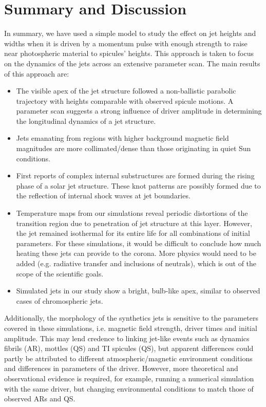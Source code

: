 \section{Summary and Discussion}
\label{sec:c2discussion}
In summary, we have used a simple model to study the effect on jet heights and widths when it is driven by a momentum pulse with enough strength to raise near photospheric material to spicules' heights. This approach is taken to focus on the dynamics of the jets across an extensive parameter scan. The main results of this approach are:  
\begin{itemize}
\item{The visible apex of the jet structure followed a non-ballistic parabolic trajectory with heights comparable with observed spicule motions. A parameter scan suggests a strong influence of driver amplitude in determining the longitudinal dynamics of a jet structure.}

\item{Jets emanating from regions with higher background magnetic field magnitudes are more collimated/dense than those originating in quiet Sun conditions.}

\item{First reports of complex internal substructures are formed during the rising phase of a solar jet structure. These knot patterns are possibly formed due to the reflection of internal shock waves at jet boundaries.}

\item{Temperature maps from our simulations reveal periodic distortions of the transition region due to penetration of jet structure at this layer. However, the jet remained isothermal for its entire life for all combinations of initial parameters. For these simulations, it would be difficult to conclude how much heating these jets can provide to the corona. More physics would need to be added (e.g. radiative transfer and inclusions of neutrals), which is out of the scope of the scientific goals.}

\item{Simulated jets in our study show a bright, bulb-like apex, similar to observed cases of chromospheric jets.}
\end{itemize}
Additionally, the morphology of the synthetics jets is sensitive to the parameters covered in these simulations, i.e. magnetic field strength, driver times and initial amplitude. This may lend credence to linking jet-like events such as dynamics fibrils (AR), mottles (QS) and TI spicules (QS), but apparent differences could partly be attributed to different atmospheric/magnetic environment conditions and differences in parameters of the driver. However, more theoretical and observational evidence is required, for example, running a numerical simulation with the same driver, but changing environmental conditions to match those of observed ARs and QS. \np
